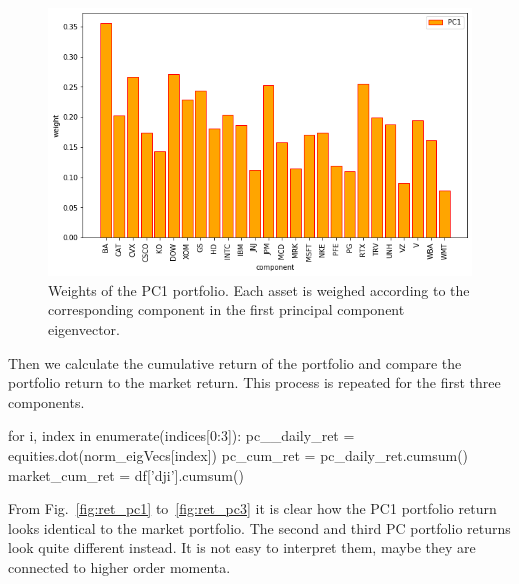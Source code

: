 \begin{figure}[htb]
	\centering
	\includegraphics[width=.7\textwidth]{figures/portfolio_pca_pc1_weights}
	\caption{Weights of the PC1 portfolio. Each asset is weighed according
		to the corresponding component in the first principal component
		eigenvector.}
	\label{fig:pca_weights}
\end{figure}
	
Then we calculate the cumulative return of the portfolio and compare the portfolio return to the market return. This process is repeated for the first three components.

\begin{ipython}
for i, index in enumerate(indices[0:3]):
    pc__daily_ret = equities.dot(norm_eigVecs[index])
    pc_cum_ret = pc_daily_ret.cumsum()
    market_cum_ret = df['dji'].cumsum()
\end{ipython}
	
From Fig.~\ref{fig:ret_pc1} to~\ref{fig:ret_pc3} it is clear how the PC1 portfolio return looks identical to the market portfolio. The second and third PC portfolio returns look quite different instead. It is not easy to interpret them, maybe they are connected to higher order momenta. 


